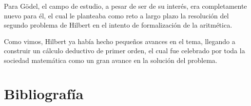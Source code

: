 Para Gödel, el campo de estudio, a pesar de ser de su interés, era completamente nuevo para él, el cual le planteaba como reto a largo plazo la resolución del segundo problema
de Hilbert en el intento de formalización de la aritmética. 

Como vimos, Hilbert ya había hecho pequeños avances en el tema, llegando a construir un cálculo deductivo de primer orden, el cual fue celebrado por toda la sociedad matemática 
como un gran avance en la solución del problema. 


\section{Bibliografía}

\cite{Zach_2007,Fer_Castro_2020,gray2000hilbert,stewart1987problems,gray2003reto,alma991014322964704990}



\endinput
